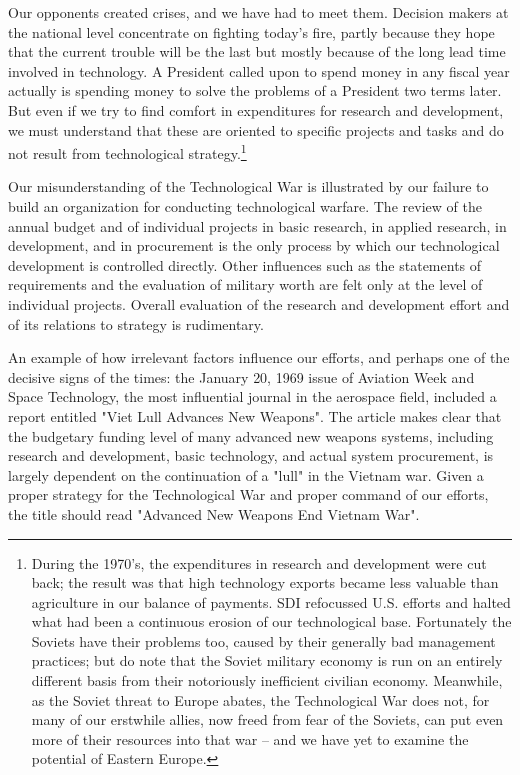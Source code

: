 Our opponents created crises, and we have had to meet them. Decision makers at the national level concentrate on fighting today's fire, partly because they hope that the current trouble will be the last but mostly because of the long lead time involved in technology. A President called upon to spend money in any fiscal year actually is spending money to solve the problems of a President two terms later. But even if we try to find comfort in expenditures for research and development, we must understand that these are oriented to specific projects and tasks and do not result from technological strategy.\footnote{
During the 1970's, the expenditures in research and development were cut back; the result was that high technology exports became less valuable than agriculture in our balance of payments. SDI refocussed U.S. efforts and halted what had been a continuous erosion of our technological base. Fortunately the Soviets have their problems too, caused by their generally bad management practices; but do note that the Soviet military economy is run on an entirely different basis from their notoriously inefficient civilian economy. Meanwhile, as the Soviet threat to Europe abates, the Technological War does not, for many of our erstwhile allies, now freed from fear of the Soviets, can put even more of their resources into that war -- and we have yet to examine the potential of Eastern Europe.}

Our misunderstanding of the Technological War is illustrated by our failure to build an organization for conducting technological warfare. The review of the annual budget and of individual projects in basic research, in applied research, in development, and in procurement is the only process by which our technological development is controlled directly. Other influences such as the statements of requirements and the evaluation of military worth are felt only at the level of individual projects. Overall evaluation of the research and development effort and of its relations to strategy is rudimentary.

An example of how irrelevant factors influence our efforts, and perhaps one of the decisive signs of the times: the January 20, 1969 issue of Aviation Week and Space Technology, the most influential journal in the aerospace field, included a report entitled "Viet Lull Advances New Weapons". The article makes clear that the budgetary funding level of many advanced new weapons systems, including research and development, basic technology, and actual system procurement, is largely dependent on the continuation of a "lull" in the Vietnam war. Given a proper strategy for the Technological War and proper command of our efforts, the title should read "Advanced New Weapons End Vietnam War".

